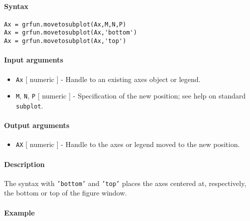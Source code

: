 


	\paragraph{Syntax}

\begin{verbatim}
Ax = grfun.movetosubplot(Ax,M,N,P)
Ax = grfun.movetosubplot(Ax,'bottom')
Ax = grfun.movetosubplot(Ax,'top')
\end{verbatim}

\paragraph{Input arguments}

\begin{itemize}
\item
  \texttt{Ax} {[} numeric {]} - Handle to an existing axes object or
  legend.
\item
  \texttt{M}, \texttt{N}, \texttt{P} {[} numeric {]} - Specification of
  the new position; see help on standard \texttt{subplot}.
\end{itemize}

\paragraph{Output arguments}

\begin{itemize}
\itemsep1pt\parskip0pt
\item
  \texttt{AX} {[} numeric {]} - Handle to the axes or legend moved to
  the new position.
\end{itemize}

\paragraph{Description}

The syntax with \texttt{'bottom'} and \texttt{'top'} places the axes
centered at, respectively, the bottom or top of the figure window.

\paragraph{Example}



